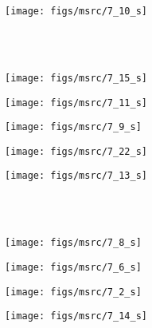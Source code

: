 \begin{titlepage}
\begin{figure}[ht]
	\begin{minipage}[]{\linewidth}
		\centering
		\texttt{[image: figs/msrc/7\_10\_s]}
	\end{minipage}
	\\
	\vspace{0.5cm}
	\\
	\begin{minipage}[]{0.19\linewidth}
		\centering
		\texttt{[image: figs/msrc/7\_15\_s]}
	\end{minipage}
	\begin{minipage}[]{0.19\linewidth}
		\centering
		\texttt{[image: figs/msrc/7\_11\_s]}
	\end{minipage}
	\begin{minipage}[]{0.19\linewidth}
		\centering
		\texttt{[image: figs/msrc/7\_9\_s]}
	\end{minipage}
	\begin{minipage}[]{0.19\linewidth}
		\centering
		\texttt{[image: figs/msrc/7\_22\_s]}
	\end{minipage}
	\begin{minipage}[]{0.19\linewidth}
		\centering
		\texttt{[image: figs/msrc/7\_13\_s]}
	\end{minipage}
	\\
	\vspace{0.5cm}
	\\
	\begin{minipage}[]{0.19\linewidth}
		\centering
		\texttt{[image: figs/msrc/7\_8\_s]}
	\end{minipage}
	\begin{minipage}[]{0.19\linewidth}
		\centering
		\texttt{[image: figs/msrc/7\_6\_s]}
	\end{minipage}
	\begin{minipage}[]{0.19\linewidth}
		\centering
		\texttt{[image: figs/msrc/7\_2\_s]}
	\end{minipage}
	\begin{minipage}[]{0.19\linewidth}
		\centering
		\texttt{[image: figs/msrc/7\_14\_s]}
	\end{minipage}

\end{figure}
\end{titlepage}
